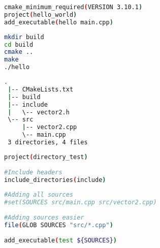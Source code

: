 \begin{minipage}{\linewidth}
\begin{minipage}{0.45\linewidth}
\begin{lstlisting}[language=bash,caption={Content of the CMakeLists.txt.\label{code:cmake:main}},emph={project, add_executable,cmake_minimum_required},emphstyle={\color{azure}\bfseries}]
cmake_minimum_required(VERSION 3.10.1)
project(hello_world)
add_executable(hello main.cpp)
\end{lstlisting}
\end{minipage}
\hfill
\begin{minipage}{0.45\linewidth}
\begin{lstlisting}[language=bash,caption={Build instructions for CMake.\label{code:cmake:compile}}]
mkdir build 
cd build
cmake ..
make
./hello
\end{lstlisting}
\end{minipage}
\end{minipage}

\begin{minipage}{\linewidth}
\begin{minipage}{0.45\linewidth}
\begin{lstlisting}[language=bash,caption={Structure of a CMake project.\label{code:cmake:folder}},emph={project, add_executable,cmake_minimum_required},emphstyle={\color{azure}\bfseries\underbar}]
 .
 |-- CMakeLists.txt
 |-- build
 |-- include
 |   \-- vector2.h
 \-- src
     |-- vector2.cpp
     \-- main.cpp
 3 directories, 4 files
\end{lstlisting}
\end{minipage}
\hfill
\begin{minipage}{0.45\linewidth}
\begin{lstlisting}[language=bash,caption={Build instructions for CMake.\label{code:cmake:complex}},emph={project, add_executable,cmake_minimum_required,include_directories,file},emphstyle={\color{azure}\bfseries\underbar}]
project(directory_test)
 
#Include headers
include_directories(include)
 
#Adding all sources 
#set(SOURCES src/main.cpp src/vector2.cpp)
 
#Adding sources easier
file(GLOB SOURCES "src/*.cpp")
 
add_executable(test ${SOURCES})
\end{lstlisting}
\end{minipage}
\end{minipage}


